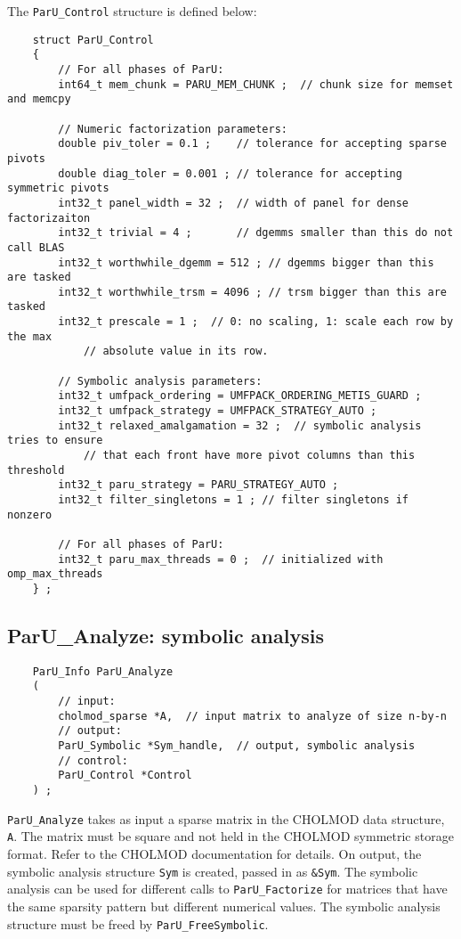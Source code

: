 \documentclass[12pt]{article}
\begin{document}
    The \verb'ParU_Control' structure is defined below:

    {\footnotesize
    \begin{verbatim}
    struct ParU_Control
    {
        // For all phases of ParU:
        int64_t mem_chunk = PARU_MEM_CHUNK ;  // chunk size for memset and memcpy

        // Numeric factorization parameters:
        double piv_toler = 0.1 ;    // tolerance for accepting sparse pivots
        double diag_toler = 0.001 ; // tolerance for accepting symmetric pivots
        int32_t panel_width = 32 ;  // width of panel for dense factorizaiton
        int32_t trivial = 4 ;       // dgemms smaller than this do not call BLAS
        int32_t worthwhile_dgemm = 512 ; // dgemms bigger than this are tasked
        int32_t worthwhile_trsm = 4096 ; // trsm bigger than this are tasked
        int32_t prescale = 1 ;  // 0: no scaling, 1: scale each row by the max
            // absolute value in its row.

        // Symbolic analysis parameters:
        int32_t umfpack_ordering = UMFPACK_ORDERING_METIS_GUARD ;
        int32_t umfpack_strategy = UMFPACK_STRATEGY_AUTO ;
        int32_t relaxed_amalgamation = 32 ;  // symbolic analysis tries to ensure
            // that each front have more pivot columns than this threshold
        int32_t paru_strategy = PARU_STRATEGY_AUTO ;
        int32_t filter_singletons = 1 ; // filter singletons if nonzero

        // For all phases of ParU:
        int32_t paru_max_threads = 0 ;  // initialized with omp_max_threads
    } ; \end{verbatim}}

\subsection{{\sf ParU\_Analyze}: symbolic analysis}

    {\footnotesize
    \begin{verbatim}
    ParU_Info ParU_Analyze
    (
        // input:
        cholmod_sparse *A,  // input matrix to analyze of size n-by-n
        // output:
        ParU_Symbolic *Sym_handle,  // output, symbolic analysis
        // control:
        ParU_Control *Control
    ) ; \end{verbatim}}

    \verb'ParU_Analyze' takes as input a sparse matrix in the CHOLMOD data
    structure, \verb'A'.  The matrix must be square and not held in the CHOLMOD
    symmetric storage format.  Refer to the CHOLMOD documentation for details.
    On output, the symbolic analysis structure \verb'Sym' is created, passed in
    as \verb'&Sym'.  The symbolic analysis can be used for different calls to
    \verb'ParU_Factorize' for matrices that have the same sparsity pattern but
    different numerical values.  The symbolic analysis structure must be freed
    by \verb'ParU_FreeSymbolic'.
\end{document}
